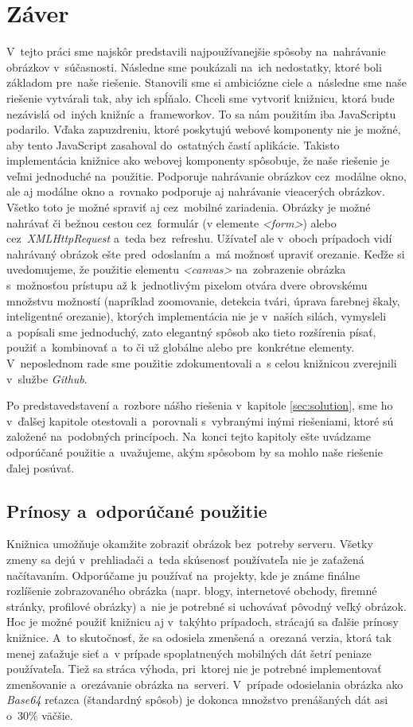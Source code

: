 \chapter{Záver}
V~tejto práci sme najskôr predstavili najpoužívanejšie spôsoby na~nahrávanie obrázkov v~súčasnosti. Následne sme poukázali na~ich nedostatky, ktoré boli základom pre~naše riešenie. Stanovili sme si ambiciózne ciele a~následne sme naše riešenie vytvárali tak, aby ich spĺňalo.
Chceli sme vytvoriť knižnicu, ktorá bude nezávislá od~iných knižníc a~frameworkov. To sa nám použitím iba JavaScriptu podarilo. Vďaka zapuzdreniu, ktoré poskytujú webové komponenty nie je možné, aby tento JavaScript zasahoval do~ostatných častí aplikácie. Takisto implementácia knižnice ako webovej komponenty spôsobuje, že naše riešenie je veľmi jednoduché na~použitie.
Podporuje nahrávanie obrázkov cez~modálne okno, ale aj modálne okno a~rovnako podporuje aj nahrávanie vieacerých obrázkov. Všetko toto je možné spraviť aj cez~mobilné zariadenia. Obrázky je možné nahrávať či bežnou cestou cez~formulár (v elemente \emph{<form>}) alebo cez~\emph{XMLHttpRequest} a~teda bez~refreshu. Užívateľ ale v~oboch prípadoch vidí nahrávaný obrázok ešte pred~odoslaním a~má možnosť upraviť orezanie.
Keďže si uvedomujeme, že použitie elementu \emph{<canvas>} na~zobrazenie obrázka s~možnosťou prístupu až k~jednotlivým pixelom otvára dvere obrovskému množstvu možností (napríklad zoomovanie, detekcia tvári, úprava farebnej škaly, inteligentné orezanie), ktorých implementácia nie je v~naších silách, vymysleli a~popísali sme jednoduchý, zato elegantný spôsob ako tieto rozšírenia písať, použiť a~kombinovať a~to či už globálne alebo pre~konkrétne elementy. V~neposlednom rade sme použitie zdokumentovali a~s celou knižnicou zverejnili v~službe \emph{Github}.

Po predstavedstavení a~rozbore nášho riešenia v~kapitole \ref{sec:solution}, sme ho v~ďalšej kapitole otestovali a~porovnali s~vybranými inými riešeniami, ktoré sú založené na~podobných princípoch. Na~konci tejto kapitoly ešte uvádzame odporúčané použitie a~uvažujeme, akým spôsobom by sa mohlo naše riešenie ďalej posúvať. 


\section{Prínosy a~odporúčané použitie}

Knižnica umožňuje okamžite zobraziť obrázok bez~potreby serveru. Všetky zmeny sa dejú v~prehliadači a~teda skúsenosť používateľa nie je zaťažená načítavaním. Odporúčame ju používať na~projekty, kde je známe finálne rozlíšenie zobrazovaného obrázka (napr. blogy, internetové obchody, firemné stránky, profilové obrázky) a~nie je potrebné si uchovávať pôvodný veľký obrázok. Hoc je možné použiť knižnicu aj v~takýhto prípadoch, strácajú sa ďalšie prínosy knižnice. A~to skutočnosť, že sa odosiela zmenšená a~orezaná verzia, ktorá tak menej zaťažuje sieť a~v prípade spoplatnených mobilných dát šetrí peniaze používateľa. Tiež sa stráca výhoda, pri~ktorej nie je potrebné implementovať zmenšovanie a~orezávanie obrázka na~serveri. V~prípade odosielania obrázka ako \emph{Base64} reťazca (štandardný spôsob) je dokonca množstvo prenášaných dát asi o~30\% väčšie.


